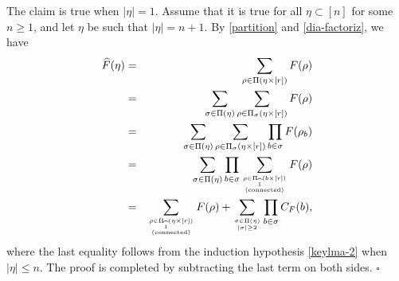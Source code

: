 \documentclass[12pt]{article}
\newcommand{\E}{\mathbb{E}}
\newtheorem{remark}[prop]{Remark}
\newenvironment{Proof}{\removelastskip\par\medskip
\noindent{\em Proof.} \rm}{\penalty-20\null\hfill$\square$\par\medbreak}
\numberwithin{equation}{section}
\begin{document}
\begin{Proof}
The claim is true when $|\eta |=1$. %
Assume that it is true for all $\eta \subset [n]$ for some $n \geq 1$, and 
 let $\eta$ be such that $|\eta |=n+1$.
 By \eqref{partition} and \eqref{dia-factoriz}, we have 
\begin{eqnarray*}
  \widehat{F}(\eta )
  &=&
  \sum_{\rho \in \Pi (\eta \times [r])} F(\rho )
  \\
  &=&
  \sum_{\sigma \in \Pi (\eta )}
  \sum_{\rho \in \Pi_\sigma (\eta \times [r])} F(\rho )
  \\
  &=&
  \sum_{\sigma \in \Pi (\eta )}
  \sum_{\rho \in \Pi_\sigma (\eta \times [r])}
  \prod_{b \in \sigma} 
  F(\rho_b ) 
 \\
  &=&
  \sum_{\sigma \in \Pi (\eta )}
  \prod_{b \in \sigma } 
  \sum_{\rho \in \Pi_{\widehat{1}} (b \times [r])
    \atop {\rm (connected)}
  } 
  F(\rho )
 \\
  &=&
 \sum_{\rho \in \Pi_{\widehat{1}} ( \eta \times [r] )
   \atop {\rm (connected)}
 }
  F(\rho )
  +
  \sum_{\sigma \in \Pi (\eta ) \atop |\sigma |\geq 2}
  \prod_{b \in \sigma } 
  C_F (b ), 
\end{eqnarray*}
where the last equality follows from the induction hypothesis \eqref{keylma-2} 
when $| \eta |\leq n$.
 The proof is completed by subtracting the last term on both sides. 
\end{Proof}
\end{document}

